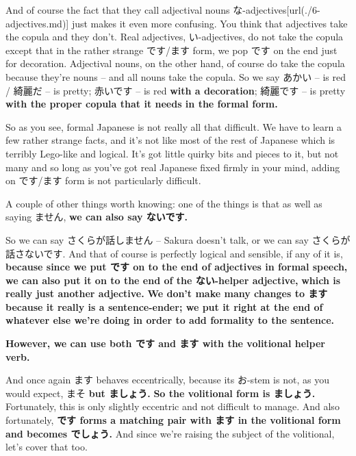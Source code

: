 {}

And of course the fact that they call adjectival nouns な-adjectives\goto{{[}6{]}}[url(./6-adjectives.md)] just makes it even more confusing. You think that adjectives take the copula and they don't. Real adjectives, い-adjectives, do not take the copula except that in the rather strange です/ます form, we pop です on the end just for decoration. Adjectival nouns, on the other hand, of course do take the copula because they're nouns -- and all nouns take the copula. So we say あかい -- is red / 綺麗だ -- is pretty; 赤いです -- is red {\bf with a decoration}; 綺麗です -- is pretty {\bf with the proper copula that it needs in the formal form.}

So as you see, formal Japanese is not really all that difficult. We have to learn a few rather strange facts, and it's not like most of the rest of Japanese which is terribly Lego-like and logical. It's got little quirky bits and pieces to it, but not many and so long as you've got real Japanese fixed firmly in your mind, adding on です/ます form is not particularly difficult.

A couple of other things worth knowing: one of the things is that as well as saying ません, {\bf we can also say ないです.}

{}

So we can say さくらが話しません -- Sakura doesn't talk, or we can say さくらが話さないです. And that of course is perfectly logical and sensible, if any of it is, {\bf because since we put です on to the end of adjectives in formal speech,} {\bf we can also put it on to the end of the ない-helper adjective,} {\bf which is really just another adjective.} {\bf We don't make many changes to ます because it really is a sentence-ender; we put it right at the end of whatever else we're doing in order to add formality to the sentence.}

\thinrule

{\bf However, we can use both です and ます with the volitional helper verb.}

{}

And once again ます behaves eccentrically, because its お-stem is not, as you would expect, まそ {\bf but ましょう.} {\bf So the volitional form is ましょう.} Fortunately, this is only slightly eccentric and not difficult to manage. And also fortunately, {\bf です forms a matching pair with ます in the volitional form and becomes でしょう.} And since we're raising the subject of the volitional, let's cover that too.

